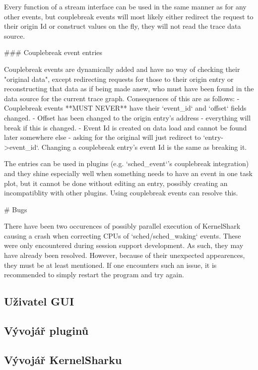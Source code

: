 \begin{code}
Every function of a stream interface can be used in the same manner as for any other events, but couplebreak events will
most likely either redirect the request to their origin Id or construct values on the fly, they will not read the trace
data source.

### Couplebreak event entries

Couplebreak events are dynamically added and have no way of checking their "original data", except redirecting requests
for those to their origin entry or reconstructing that data as if being made anew, who must have been found in the data 
source for the current trace graph. Consequences of this are as follows:
- Couplebreak events **MUST NEVER** have their `event_id` and `offset` fields changed.
  - Offset has been changed to the origin entry's address - everything will break if this is changed.
  - Event Id is created on data load and cannot be found later somewhere else - asking for the original will just
    redirect to `entry->event_id`. Changing a couplebreak entry's event Id is the same as breaking it.

The entries can be used in plugins (e.g. `sched_event`'s couplebreak integration) and they shine especially well when
something needs to have an event in one task plot, but it cannot be done without editing an entry, possibly creating
an incompatiblity with other plugins. Using couplebreak events can resolve this. 

# Bugs

There have been two occurences of possibly parallel execution of KernelShark causing a crash when correcting CPUs of
`sched/sched_waking` events. These were only encountered during session support development. As such, they may have already
been resolved. However, because of their unexpected appearences, they must be at least mentioned. If one encounters such
an issue, it is recommended to simply restart the program and try again.
\end{code}

\subsection{Uživatel GUI}

\subsection{Vývojář pluginů}

\subsection{Vývojář KernelSharku}

